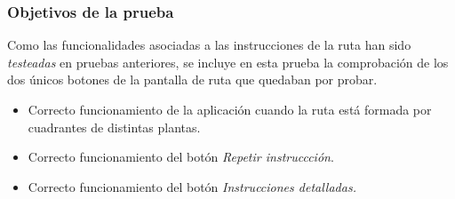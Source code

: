 \subsubsection*{Objetivos de la prueba}

Como las funcionalidades asociadas a las instrucciones de la ruta han sido \textit{testeadas} en pruebas anteriores, se incluye en esta prueba la comprobación de los dos únicos botones de la pantalla de ruta que quedaban por probar.

\begin{itemize}
	\item Correcto funcionamiento de la aplicación cuando la ruta está formada por cuadrantes de distintas plantas. 
	
	\item Correcto funcionamiento del botón \textit{Repetir instruccción}.
	
	\item Correcto funcionamiento del botón \textit{Instrucciones detalladas.}
\end{itemize}

